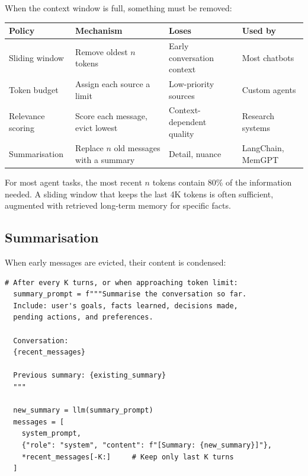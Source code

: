 When the context window is full, something must be removed:

\begin{longtable}{p{3.5cm}p{4cm}p{4cm}p{3cm}}
	\toprule
	\textbf{Policy}   & \textbf{Mechanism}                      & \textbf{Loses}             & \textbf{Used by}  \\
	\midrule
	Sliding window    & Remove oldest $n$ tokens                & Early conversation context & Most chatbots     \\
	Token budget      & Assign each source a limit              & Low-priority sources       & Custom agents     \\
	Relevance scoring & Score each message, evict lowest        & Context-dependent quality  & Research systems  \\
	Summarisation     & Replace $n$ old messages with a summary & Detail, nuance             & LangChain, MemGPT \\
	\bottomrule
\end{longtable}

\begin{principle}
	For most agent tasks, the most recent $n$ tokens contain 80\% of the information needed. A sliding window that keeps the last 4K tokens is often sufficient, augmented with retrieved long-term memory for specific facts.
\end{principle}

\subsection{Summarisation}

When early messages are evicted, their content is condensed:

\begin{lstlisting}[caption=Running summarisation for context management]
  # After every K turns, or when approaching token limit:
  summary_prompt = f"""Summarise the conversation so far.
  Include: user's goals, facts learned, decisions made,
  pending actions, and preferences.

  Conversation:
  {recent_messages}

  Previous summary: {existing_summary}
  """

  new_summary = llm(summary_prompt)
  messages = [
    system_prompt,
    {"role": "system", "content": f"[Summary: {new_summary}]"},
    *recent_messages[-K:]     # Keep only last K turns
  ]
\end{lstlisting}

